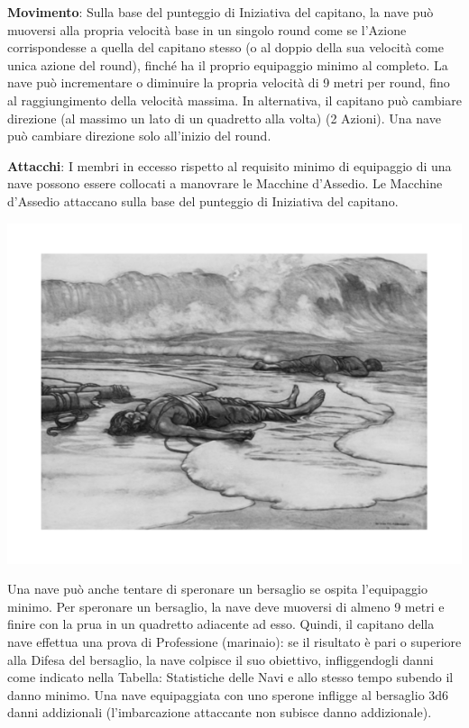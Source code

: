 \documentclass[a4paper,twoside,openany]{book}
\begin{document}
\begin{multicols}{2}
\textbf{Movimento}: Sulla base del punteggio di Iniziativa del capitano, la nave può muoversi alla propria velocità base in un singolo round come se l'Azione corrispondesse a quella del capitano stesso (o al doppio della sua velocità come unica azione del round), finché ha il proprio equipaggio minimo al completo. La nave può incrementare o diminuire la propria velocità di 9 metri per round, fino al raggiungimento della velocità massima. In alternativa, il capitano può cambiare direzione (al massimo un lato di un quadretto alla volta) (2 Azioni). Una nave può cambiare direzione solo all'inizio del round.

\textbf{Attacchi}: I membri in eccesso rispetto al requisito minimo di equipaggio di una nave possono essere collocati a manovrare le Macchine d'Assedio. Le Macchine d'Assedio attaccano sulla base del punteggio di Iniziativa del capitano.


\begin{center}
\includegraphics[width=0.9\linewidth]{immagini/acquapericoli.png}
\end{center}

Una nave può anche tentare di speronare un bersaglio se ospita l'equipaggio minimo. Per speronare un bersaglio, la nave deve muoversi di almeno 9 metri e finire con la prua in un quadretto adiacente ad esso.
Quindi, il capitano della nave effettua una prova di Professione (marinaio): se il risultato è pari o superiore alla Difesa del bersaglio, la nave colpisce il suo obiettivo, infliggendogli danni come indicato nella Tabella: Statistiche delle Navi e allo stesso tempo subendo il danno minimo. Una nave equipaggiata con uno sperone infligge al bersaglio 3d6 danni addizionali (l'imbarcazione attaccante non subisce danno addizionale).


\end{multicols}
\end{document}
